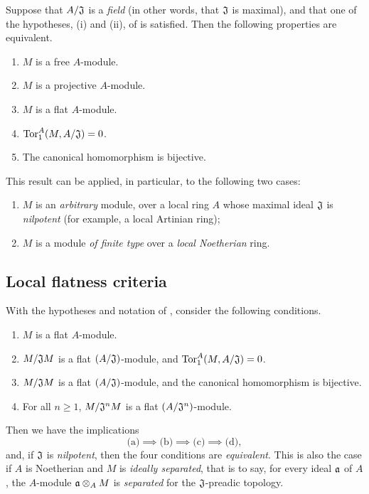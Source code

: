\begin{env}[10.1.3]
\label{0.10.1.3}
Suppose that $A/\mathfrak{J}$ is a \emph{field} (in other words, that $\mathfrak{J}$ is maximal), and that one of the hypotheses, (i) and (ii), of  is satisfied.
Then the following properties are equivalent.
\begin{enumerate}[label=\emph{(\alph*)}]
    \item $M$ is a free $A$-module.
    \item $M$ is a projective $A$-module.
    \item $M$ is a flat $A$-module.
    \item ${\mathop{\mathrm{Tor}}\nolimits}_1^A(M,A/\mathfrak{J})=0$.
    \item The canonical homomorphism  is bijective.
\end{enumerate}
\end{env}

This result can be applied, in particular, to the following two cases:
\begin{enumerate}[label=(\roman*)]
    \item $M$ is an \emph{arbitrary} module, over a local ring $A$ whose maximal ideal $\mathfrak{J}$ is \emph{nilpotent} (for example, a local Artinian ring);
    \item $M$ is a module \emph{of finite type} over a \emph{local Noetherian} ring.
\end{enumerate}

\subsection{Local flatness criteria}
\label{subsection:local-flatness-criteria}

\begin{env}[10.2.1]
\label{0.10.2.1}
With the hypotheses and notation of , consider the following conditions.
\begin{enumerate}[label=\emph{(\alph*)}]
    \item $M$ is a flat $A$-module.
    \item $M/\mathfrak{J}M$ is a flat $(A/\mathfrak{J})$-module, and ${\mathop{\mathrm{Tor}}\nolimits}_1^A(M,A/\mathfrak{J})=0$.
    \item $M/\mathfrak{J}M$ is a flat $(A/\mathfrak{J})$-module, and the canonical homomorphism  is bijective.
    \item For all $n\geq1$, $M/\mathfrak{J}^nM$ is a flat $(A/\mathfrak{J}^n)$-module.
\end{enumerate}

Then we have the implications
\[
    \text{(a)}\implies\text{(b)}\implies\text{(c)}\implies\text{(d)},
\]
and, if $\mathfrak{J}$ is \emph{nilpotent}, then the four conditions are \emph{equivalent}.
This is also the case if $A$ is Noetherian and $M$ is \emph{ideally separated}, that is to say, for every ideal $\mathfrak{a}$ of $A$, the $A$-module $\mathfrak{a}\otimes_A M$ is \emph{separated} for the $\mathfrak{J}$-preadic topology.
\end{env}

